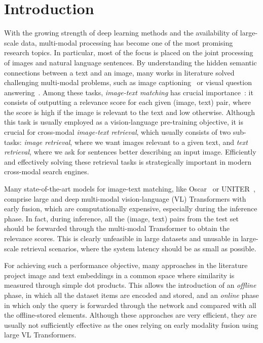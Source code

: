 \documentclass[sigconf]{acmart}
\begin{document}
\section{Introduction}
\label{sec:intro}
With the growing strength of deep learning methods and the availability of large-scale data, multi-modal processing has become one of the most promising research topics. In particular, most of the focus is placed on the joint processing of images and natural language sentences. By understanding the hidden semantic connections between a text and an image, many works in literature solved challenging multi-modal problems, such as image captioning~\citep{Anderson2018bottomup,cornia2020meshed,stefanini2022show} or visual question answering~\citep{Anderson2018bottomup,zhou2020unified,banerjee2021weakly}.
Among these tasks, \textit{image-text matching} has crucial importance~\citep{kiros2014unifying,vsepp2018faghri,cornia2020unified,messina2021fine,messina2021towards}: it consists of outputting a relevance score for each given (image, text) pair, where the score is high if the image is relevant to the text and low otherwise. Although this task is usually employed as a vision-language pre-training objective, it is crucial for cross-modal \textit{image-text retrieval}, which usually consists of two sub-tasks: \textit{image retrieval}, where we want images relevant to a given text, and \textit{text retrieval}, where we ask for sentences better describing an input image. Efficiently and effectively solving these retrieval tasks is strategically important in modern cross-modal search engines.

Many state-of-the-art models for image-text matching, like Oscar~\citep{li2020oscar} or UNITER~\citep{uniter2020}, comprise large and deep multi-modal vision-language (VL) Transformers with early fusion, which are computationally expensive, especially during the inference phase. In fact, during inference, all the (image, text) pairs from the test set should be forwarded through the multi-modal Transformer to obtain the relevance scores. This is clearly unfeasible in large datasets and unusable in large-scale retrieval scenarios, where the system latency should be as small as possible.

For achieving such a performance objective, many approaches in the literature project image and text embeddings in a common space where similarity is measured through simple dot products. This allows the introduction of an \textit{offline} phase, in which all the dataset items are encoded and stored, and an \textit{online} phase in which only the query is forwarded through the network and compared with all the offline-stored elements. Although these approaches are very efficient, they are usually not sufficiently effective as the ones relying on early modality fusion using large VL Transformers.
\end{document}
